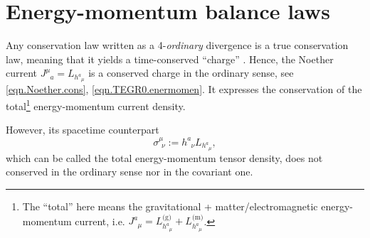 \documentclass[
10pt, %
a4paper, %
oneside, %
twocolumn,
headinclude,footinclude, %
BCOR5mm, %
]{scrartcl}
\newcommand{\pd}[1]{\partial_{#1}}
\newcommand{\tetrsymbol}{h}
\newcommand{\tetr}[2]{\tetrsymbol^{#1}_{\phantom{#1}#2}}
\newcommand{\D}[1]{\partial_{#1}} %
\newcommand{\Tors}[2]{T^{#1}_{\phantom{#1}#2}}
\newcommand{\Laghodge}{L}%
\newcommand{\EMmat}[2]{\sigma^{#1}_{\ \,#2}}
\newcommand{\LCsymb}{\bm{\in}}    %
\newcommand{\HDT}[1]{\accentset{\star}{T}^{#1}}
\newcommand{\NC}[2]{J^{#2}_{\phantom{#2}#1}}
\begin{document}
	
	\section{Energy-momentum balance laws}
	
	Any conservation law written as a  4-\emph{ordinary} divergence is a
	true conservation law, meaning that it yields a time-conserved 
	``charge'' \cite{AldrovandiPereiraBook}. Hence, the Noether current $ \NC{a}{\mu} 
	=\Laghodge_{\tetr{a}{\mu}}$ is a conserved charge in the ordinary sense, see 
	\eqref{eqn.Noether.cons}, \eqref{eqn.TEGR0.enermomen}. It expresses the conservation of the 
	total\footnote{The ``total'' here 
		means the gravitational + matter/electromagnetic energy-momentum current, i.e. $ 
		\NC{\mu}{a} = \Laghodge^\text{(g)}_{\tetr{a}{\mu}} + \Laghodge^\text{(m)}_{\tetr{a}{\mu}} 
		$.} 
	energy-momentum current density. 
	
	However, its spacetime counterpart 
	\begin{equation}\label{eqn.stress}
		\EMmat{\mu}{\nu}:=\tetr{a}{\nu} L_{\tetr{a}{\mu}},
	\end{equation}
	which can be called the total energy-momentum tensor density, does not
	conserved in the ordinary sense nor in the covariant one.
	
\end{document}
